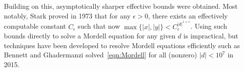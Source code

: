 \documentclass[sigplan,10pt,nonacm,
screen]{acmart} \settopmatter{printfolios=true,printccs=false,printacmref=false}
\newcommand{\ZZ}{\mathbf{Z}}
\newcommand{\NN}{\mathbf{N}}
\begin{document}
%
Building on this, asymptotically sharper effective bounds were obtained. Most notably, Stark \cite{Stark1973} proved in 1973 that for any $\epsilon >0$, there exists an effectively computable constant $C_\epsilon$ such that now $\max\{|x|,|y|\}<C_\epsilon^{|d|^{1+\epsilon}}$. Using such bounds directly to solve a Mordell equation for any given $d$ is impractical, but techniques have been developed to resolve Mordell equations efficiently such as Bennett and Ghadermanzi \cite{bennett_mordells_2015} solved~\eqref{eqn:Mordell} for all (nonzero) $|d|<10^7$ in 2015.



\end{document}

